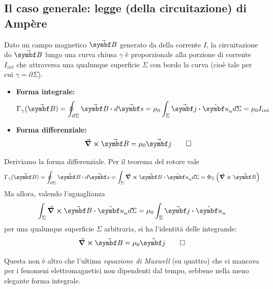 \subsection{Il caso generale: legge (della circuitazione) di Ampère}
\begin{theorema}
	Dato un campo magnetico $\vba{B}$ generato da della corrente $I$, la circuitazione do $\vba{B}$ lungo una curva chiusa $\gamma$ è proporzionale alla porzione di corrente $I_{int}$ che attraversa una qualunque superficie $\Sigma$ con bordo la curva (cioè tale per cui $\gamma=\partial\Sigma$).
	\begin{itemize}
		\item \textbf{Forma integrale:}
		\begin{equation}
			\Gamma_{\gamma}(\vba{B})=\oint_{\partial \Sigma} \vba{B}\vdot d\vba{s}=\mu_0\int_{\Sigma}\vba{j}\vdot\vbh{u}_nd\Sigma=\mu_0 I_{int}\label{LeggeAmpereMagnetostaticaIntegrale}
		\end{equation}
		\item \textbf{Forma differenziale:}
		\begin{equation}
			\curl{\vba{B}}=\mu_0\vba{j}\label{LeggeAmpereMagnetostaticaDifferenziale}\qedhere
		\end{equation}
	\end{itemize}
\end{theorema}
\begin{demonstration}
	Deriviamo la forma differenziale. Per il teorema del rotore vale
	\begin{equation*}
		\Gamma_{\gamma}(\vba{B})=\oint_{\partial \Sigma} \vba{B}\vdot d\vba{s}=\int_{\Sigma}\curl{\vba{B}}\vdot\vbh{u}_nd\Sigma=\Phi_{\Sigma}\left(\curl{\vba{B}}\right)
	\end{equation*}
	Ma allora, valendo l'uguaglianza
	\begin{equation*}
		\int_{\Sigma}\curl{\vba{B}}\vdot\vbh{u}_nd\Sigma=\mu_0\int_{\Sigma}\vba{j}\vdot\vbh{u}_n
	\end{equation*}
	per una qualunque superficie $\Sigma$ arbitraria, si ha l'identità delle integrande:
	\begin{equation*}
		\curl{\vba{B}}=\mu_0\vba{j}\qedhere
	\end{equation*}
\end{demonstration}
Questa non è altro che l'ultima \textit{equazione di Maxwell} (su quattro) che ci mancava per i fenomeni elettromagnetici non dipendenti dal tempo, sebbene nella meno elegante forma integrale.
